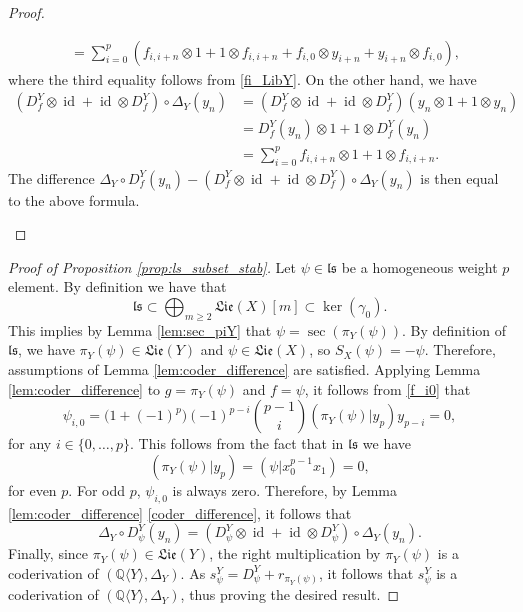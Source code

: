 \documentclass[11pt, a4paper]{amsart}
\numberwithin{equation}{section}
\theoremstyle{definition}
\newcommand{\Q}{\mathbb{Q}}
\newcommand{\QY}{\Q\langle Y\rangle}
\newcommand{\id}{\operatorname{id}}
\newcommand{\Lie}{\mathfrak{Lie}}
\begin{document}
\begin{proof}
\begin{enumerate}[label=(\alph*), leftmargin=*]
\begin{align*}
            & = \sum_{i=0}^p (f_{i,i+n} \otimes 1 + 1 \otimes f_{i,i+n} + f_{i,0} \otimes y_{i+n} + y_{i+n} \otimes f_{i,0}),
        \end{align*}
        where the third equality follows from \ref{fi_LibY}. On the other hand, we have
        \begin{align*}
            (D_f^Y \otimes \id + \id \otimes D_f^Y) \circ \Delta_Y (y_n) & = (D_f^Y \otimes \id + \id \otimes D_f^Y)(y_n \otimes 1 + 1 \otimes y_n) \\
            & = D_f^Y(y_n) \otimes 1 + 1 \otimes D_f^Y(y_n) \\
            & = \sum_{i=0}^p f_{i,i+n} \otimes 1 + 1 \otimes f_{i,i+n}. 
        \end{align*}
        The difference $\Delta_Y \circ D^Y_f(y_n) - (D_f^Y \otimes \id + \id \otimes D_f^Y) \circ \Delta_Y (y_n)$ is then equal to the above formula.
    \end{enumerate}
\end{proof}

\begin{proof}[Proof of Proposition \ref{prop:ls_subset_stab}]
    Let $\psi \in \mathfrak{ls}$ be a homogeneous weight $p$ element. By definition we have that
    \[
        \mathfrak{ls} \subset \bigoplus_{m \geq 2} \Lie(X)[m] \subset \ker(\gamma_0).
    \]
    This implies by Lemma \ref{lem:sec_piY} that $\psi = \sec(\pi_Y(\psi))$. By definition of $\mathfrak{ls}$, we have $\pi_Y(\psi) \in \Lie(Y)$ and $\psi \in \Lie(X)$, so $S_X(\psi)=-\psi$. Therefore, assumptions of Lemma \ref{lem:coder_difference} are satisfied.
    Applying Lemma \ref{lem:coder_difference} to $g=\pi_Y(\psi)$ and $f=\psi$, it follows from \ref{f_i0} that
    \[
        \psi_{i,0} = \big(1+(-1)^p\big)(-1)^{p-i} \binom{p-1}{i} (\pi_Y(\psi) | y_p) y_{p-i} = 0,
    \]
    for any $i \in \{0, \dots, p\}$. This follows from the fact that in $\mathfrak{ls}$ we have
    \[
        (\pi_Y(\psi) | y_p) = (\psi | x_0^{p-1} x_1) = 0,
    \]
    for even $p$. For odd $p$, $\psi_{i,0}$ is always zero. Therefore, by Lemma \ref{lem:coder_difference} \ref{coder_difference}, it follows that
    \[
        \Delta_Y \circ D^Y_\psi(y_n) = (D_\psi^Y \otimes \id + \id \otimes D_\psi^Y) \circ \Delta_Y (y_n).
    \]
    Finally, since $\pi_Y(\psi) \in \Lie(Y)$, the right multiplication by $\pi_Y(\psi)$ is a coderivation of $(\QY, \Delta_Y)$. As $s_\psi^Y = D_\psi^Y + r_{\pi_Y(\psi)}$, it follows that $s_\psi^Y$ is a coderivation of $(\QY, \Delta_Y)$, thus proving the desired result. 
\end{proof}
\end{document}
